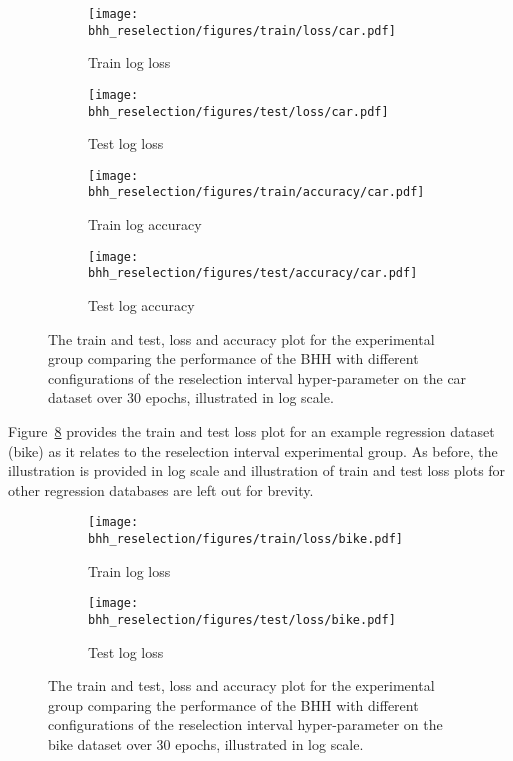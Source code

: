 \begin{figure}[H]
	\begin{subfigure}{0.5\textwidth}
		\centering
		\texttt{[image: bhh\_reselection/figures/train/loss/car.pdf]}
		\caption{Train log loss}
		\label{fig:results:reselection:figures:loss:train:car}
	\end{subfigure}
	\begin{subfigure}{0.5\textwidth}
		\centering
		\texttt{[image: bhh\_reselection/figures/test/loss/car.pdf]}
		\caption{Test log loss}
		\label{fig:results:reselection:figures:loss:test:car}
	\end{subfigure}
	\par\bigskip
	\begin{subfigure}{0.5\textwidth}
		\centering
		\texttt{[image: bhh\_reselection/figures/train/accuracy/car.pdf]}
		\caption{Train log accuracy}
		\label{fig:results:reselection:figures:accuracy:train:car}
	\end{subfigure}
	\begin{subfigure}{0.5\textwidth}
		\centering
		\texttt{[image: bhh\_reselection/figures/test/accuracy/car.pdf]}
		\caption{Test log accuracy}
		\label{fig:results:reselection:figures:accuracy:test:car}
	\end{subfigure}
	\par\bigskip
	\caption{The train and test, loss and accuracy plot for the experimental group comparing the performance of the \acs{BHH} with different configurations of the reselection interval hyper-parameter on the car dataset over 30 epochs, illustrated in log scale.}
	\label{fig:results:reselection:figures:car}
\end{figure}

Figure~\ref{fig:results:reselection:figures:bike} provides the train and test loss plot for an example regression dataset (bike) as it relates to the reselection interval experimental group. As before, the illustration is provided in log scale and illustration of train and test loss plots for other regression databases are left out for brevity.

\begin{figure}[H]
	\begin{subfigure}{0.5\textwidth}
		\centering
		\texttt{[image: bhh\_reselection/figures/train/loss/bike.pdf]}
		\caption{Train log loss}
		\label{fig:results:reselection:figures:loss:train:bike}
	\end{subfigure}
	\begin{subfigure}{0.5\textwidth}
		\centering
		\texttt{[image: bhh\_reselection/figures/test/loss/bike.pdf]}
		\caption{Test log loss}
		\label{fig:results:reselection:figures:loss:test:bike}
	\end{subfigure}
	\par\bigskip
	\caption{The train and test, loss and accuracy plot for the experimental group comparing the performance of the \acs{BHH} with different configurations of the reselection interval hyper-parameter on the bike dataset over 30 epochs, illustrated in log scale.}
	\label{fig:results:reselection:figures:bike}
\end{figure}

